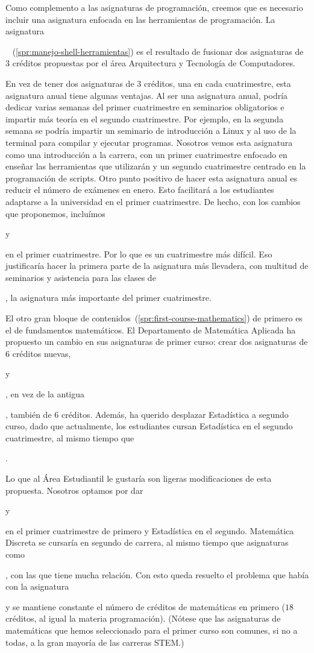 Como complemento a las asignaturas de programación,
creemos que es necesario incluir
una asignatura enfocada en las herramientas de programación.
La asignatura \subject{Manejo de Shell y Herramientas Básicas de Programación}~%
(\cref{spr:manejo-shell-herramientas})
es el resultado de fusionar dos asignaturas de $3$ créditos propuestas por
el área Arquitectura y Tecnología de Computadores.

En vez de tener dos asignaturas de $3$ créditos,
una en cada cuatrimestre,
esta asignatura anual tiene algunas ventajas.
Al ser una asignatura anual,
podría dedicar varias semanas del primer cuatrimestre
en seminarios obligatorios
e impartir más teoría en el segundo cuatrimestre.
Por ejemplo, en la segunda semana se podría impartir un seminario de
introducción a Linux y al uso de la terminal para compilar y ejecutar programas.
Nosotros vemos esta asignatura como una introducción a la carrera,
con un primer cuatrimestre enfocado en
enseñar las herramientas que utilizarán
y un segundo cuatrimestre centrado en la programación de scripts.
Otro punto positivo de hacer esta asignatura anual es
reducir el número de exámenes en enero.
Esto facilitará a los estudiantes
adaptarse a la universidad en el primer cuatrimestre.
De hecho, con los cambios que proponemos,
incluímos \subject{Álgebra Lineal} y \subject{Cálculo} en el primer cuatrimestre.
Por lo que es un cuatrimestre más difícil.
Eso justificaría hacer la primera parte de la asignatura más llevadera,
con multitud de seminarios y asistencia para las clases de
\subject{Programación I}, la asignatura más importante del primer cuatrimestre.

El otro gran bloque de contenidos~(\cref{spr:first-course-mathematics})
de primero es el de fundamentos matemáticos.
El Departamento de Matemática Aplicada
ha propuesto un cambio en sus asignaturas de primer curso:
crear dos asignaturas de $6$ créditos nuevas,
\subject{Álgebra Lineal} y \subject{Matemática Discreta},
en vez de la antigua \subject{Álgebra y Matemática Discreta},
también de $6$ créditos.
Además, ha querido desplazar Estadística a segundo curso,
dado que actualmente,
los estudiantes cursan Estadística en el segundo cuatrimestre,
al mismo tiempo que \subject{Cálculo}.

Lo que al Área Estudiantil le gustaría son
ligeras modificaciones de esta propuesta.
Nosotros optamos por dar \subject{Álgebra Lineal} y \subject{Cálculo}
en el primer cuatrimestre de primero y
Estadística en el segundo.
Matemática Discreta se cursaría en segundo de carrera,
al mismo tiempo que asignaturas como
\subject{Algoritmos y Estructuras de Datos},
con las que tiene mucha relación.
Con esto queda resuelto el problema que había con
la asignatura \subject{Estadística} y
se mantiene constante el número de créditos de matemáticas en primero
($18$ créditos, al igual la materia programación).
(Nótese que las asignaturas de matemáticas que
hemos seleccionado para el primer curso
son comunes, si no a todas, a la gran mayoría de las carreras STEM.)

